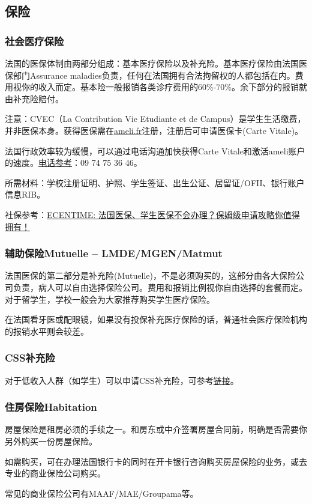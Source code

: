 \subsection{保险}

\subsubsection{社会医疗保险}

法国的医保体制由两部分组成：基本医疗保险以及补充险。基本医疗保险由法国医保部门Assurance maladies负责，任何在法国拥有合法拘留权的人都包括在内。费用视你的收入而定。基本险一般报销各类诊疗费用的60\%-70\%。余下部分的报销就由补充险赔付。

注意：CVEC（La Contribution Vie Etudiante et de Campus）是学生生活缴费，并非医保本身。获得医保需在\href{https://www.ameli.fr/}{ameli.fr}注册，注册后可申请医保卡(Carte Vitale)。

法国行政效率较为缓慢，可以通过电话沟通加快获得Carte Vitale和激活ameli账户的速度。\href{https://www.ameli.fr/paris/assure/english-pages}{电话参考}：09 74 75 36 46。

所需材料：学校注册证明、护照、学生签证、出生公证、居留证/OFII、银行账户信息RIB。

社保参考：\href{https://www.ecentime.com/article/assurance-maladie}{ECENTIME: 法国医保、学生医保不会办理？保姆级申请攻略你值得拥有！}
 
\subsubsection{辅助保险Mutuelle – LMDE/MGEN/Matmut}

法国医保的第二部分是补充险(Mutuelle)，不是必须购买的，这部分由各大保险公司负责，病人可以自由选择保险公司。费用和报销比例视你自由选择的套餐而定。对于留学生，学校一般会为大家推荐购买学生医疗保险。

在法国看牙医或配眼镜，如果没有投保补充医疗保险的话，普通社会医疗保险机构的报销水平则会较差。

\subsubsection{CSS补充险}
对于低收入人群（如学生）可以申请CSS补充险，可参考\href{https://www.xiaohongshu.com/explore/6244b05d00000000210386be?note_flow_source=wechat}{链接}。

\subsubsection{住房保险Habitation} 
房屋保险是租房必须的手续之一。和房东或中介签署房屋合同前，明确是否需要你另外购买一份房屋保险。

如需购买，可在办理法国银行卡的同时在开卡银行咨询购买房屋保险的业务，或去专业的商业保险公司购买。

常见的商业保险公司有MAAF/MAE/Groupama等。
